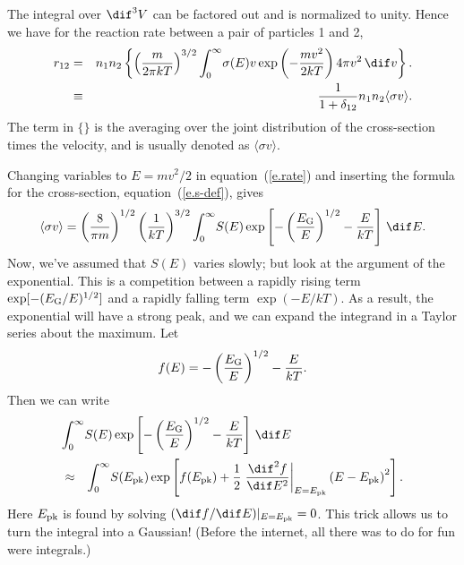 The integral over $\dif^{3}V$ can be factored out and is normalized to unity. Hence we have for the reaction rate between a pair of particles 1 and 2, 
\begin{eqnarray}\label{e.rate}
r_{12} &=& n_{1}n_{2}\left\{\left(\frac{m}{2\pi kT}\right)^{3/2}\int_{0}^{\infty}\! \sigma(E) v \exp\left(-\frac{mv^{2}}{2kT}\right)  4\pi v^{2}\,\dif v\right\}.\nonumber\\
 &\equiv& \frac{1}{1+\delta_{12}}n_{1}n_{2}\langle\sigma v\rangle.
\end{eqnarray}
The term in $\{\}$ is the averaging over the joint distribution of the cross-section times the velocity, and is usually denoted as $\langle\sigma v\rangle$. 

Changing variables to $E = mv^{2}/2$ in equation~(\ref{e.rate}) and inserting the formula for the cross-section, equation~(\ref{e.s-def}), gives
\begin{equation}\label{e.integral}
\langle\sigma v\rangle = \left(\frac{8}{\pi m}\right)^{1/2}\left(\frac{1}{kT}\right)^{3/2}\int_{0}^{\infty}\!S(E)\exp\left[-\left(\frac{\EG}{E}\right)^{1/2}-\frac{E}{kT}\right]\,\dif E.
\end{equation}
Now, we've assumed that $S(E)$ varies slowly; but look at the argument of the exponential. This is a competition between a rapidly rising term $\exp[-(E_{\mathrm{G}}/E)^{1/2}]$ and a rapidly falling term $\exp(-E/kT)$. As a result, the exponential will have a strong peak, and we can expand the integrand in a Taylor series about the maximum. Let 
\[
f(E) = -\left(\frac{E_{\mathrm{G}}}{E}\right)^{1/2} - \frac{E}{kT}.
\]
Then we can write 
\begin{eqnarray*}
\lefteqn{\int_{0}^{\infty}\!S(E)\exp\left[-\left(\frac{\EG}{E}\right)^{1/2}-\frac{E}{kT}\right]\,\dif E}\\
&\approx&
	\int_{0}^{\infty}\! S(\Epk)\exp\left[f(\Epk) + \frac{1}{2}\left.\frac{\dif^{2} f}{\dif E^{2}}\right|_{E=\Epk}\left(E-\Epk\right)^{2}\right].
\end{eqnarray*}
Here $E_{\mathrm{pk}}$ is found by solving $(\dif f/\dif E)|_{E=\Epk} = 0$. This trick allows us to turn the integral into a Gaussian! (Before the internet, all there was to do for fun were integrals.)

